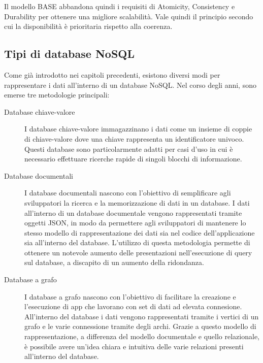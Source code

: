 Il modello BASE abbandona quindi i requisiti di Atomicity, Consistency e Durability per ottenere una migliore scalabilità. Vale quindi il principio secondo cui la disponibilità è prioritaria rispetto alla coerenza.

\subsection{Tipi di database NoSQL}
Come già introdotto nei capitoli precedenti, esistono diversi modi per rappresentare i dati all'interno di un database NoSQL. Nel corso degli anni, sono emerse tre metodologie principali:
\begin{description}
    \item[Database chiave-valore]I database chiave-valore immagazzinano i dati come un insieme di coppie di chiave-valore dove una chiave rappresenta un identificatore univoco. Questi database sono particolarmente adatti per casi d'uso in cui è necessario effettuare ricerche rapide di singoli blocchi di informazione.
    \item[Database documentali]I database documentali nascono con l'obiettivo di semplificare agli sviluppatori la ricerca e la memorizzazione di dati in un database. I dati all'interno di un database documentale vengono rappresentati tramite oggetti JSON, in modo da permettere agli sviluppatori di mantenere lo stesso modello di rappresentazione dei dati sia nel codice dell'applicazione sia all'interno del database. L'utilizzo di questa metodologia permette di ottenere un notevole aumento delle presentazioni nell'esecuzione di query sul database, a discapito di un aumento della ridondanza.
    \item[Database a grafo]I database a grafo nascono con l'obiettivo di facilitare la creazione e l'esecuzione di app che lavorano con set di dati ad elevata connesione.  All'interno del database i dati vengono rappresentati tramite i vertici di un grafo e le varie connessione tramite degli archi. Grazie a questo modello di rappresentazione, a differenza del modello documentale e quello relazionale, è possibile avere un'idea chiara e intuitiva delle varie relazioni presenti all'interno del database.
\end{description}

